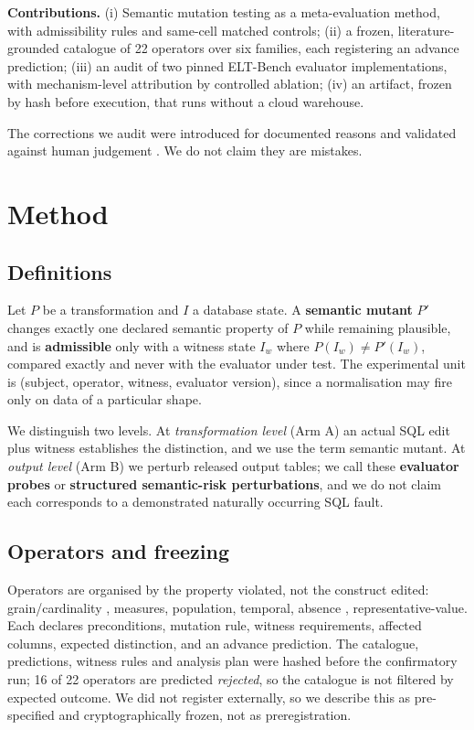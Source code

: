 \documentclass[10pt,conference]{IEEEtran}
\begin{document}
\textbf{Contributions.} (i) Semantic mutation testing as a meta-evaluation method,
with admissibility rules and same-cell matched controls; (ii) a frozen,
literature-grounded catalogue of 22 operators over six families, each registering
an advance prediction; (iii) an audit of two pinned ELT-Bench evaluator
implementations, with mechanism-level attribution by controlled ablation; (iv) an
artifact, frozen by hash before execution, that runs without a cloud warehouse.

The corrections we audit were introduced for documented reasons and validated
against human judgement \cite{eltverified}. We do not claim they are mistakes.

\section{Method}
\label{sec:method}

\subsection{Definitions}

Let $P$ be a transformation and $I$ a database state. A \textbf{semantic mutant}
$P'$ changes exactly one declared semantic property of $P$ while remaining
plausible, and is \textbf{admissible} only with a witness state $I_w$ where
$P(I_w)\neq P'(I_w)$, compared exactly and never with the evaluator under test.
The experimental unit is (subject, operator, witness, evaluator version), since a
normalisation may fire only on data of a particular shape.

We distinguish two levels. At \emph{transformation level} (Arm A) an actual SQL
edit plus witness establishes the distinction, and we use the term semantic
mutant. At \emph{output level} (Arm B) we perturb released output tables; we call
these \textbf{evaluator probes} or \textbf{structured semantic-risk
perturbations}, and we do not claim each corresponds to a demonstrated naturally
occurring SQL fault.

\subsection{Operators and freezing}

Operators are organised by the property violated, not the construct edited:
grain/cardinality \cite{kimball}, measures, population, temporal, absence
\cite{codd}, representative-value. Each declares preconditions, mutation rule,
witness requirements, affected columns, expected distinction, and an advance
prediction. The catalogue, predictions, witness rules and analysis plan were
hashed before the confirmatory run; 16 of 22 operators are predicted
\emph{rejected}, so the catalogue is not filtered by expected outcome. We did not
register externally, so we describe this as pre-specified and cryptographically
frozen, not as preregistration.
\end{document}
